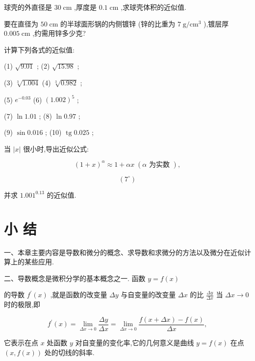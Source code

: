 \documentclass[lang=cn,newtx,12pt,scheme=chinese]{elegantbook}
\begin{document}
\begin{problemset}[习 题 八]
\item 球壳的外直径是 \({30}\mathrm{\;{cm}}\) ,厚度是 \({0.1}\mathrm{\;{cm}}\) ,求球壳体积的近似值.

\item 要在直径为 \({50}\mathrm{\;{cm}}\) 的半球面形锅的内侧镀锌 (锌的比重为 \(7\mathrm{\;g}/{\mathrm{{cm}}}^{3}\) ),镀层厚 \({0.005}\mathrm{\;{cm}}\) ,约需用锌多少克?

\item 计算下列各式的近似值:

(1) \(\sqrt{9.01}\) ; (2) \(\sqrt{15.98}\) ;

(3) \(\sqrt[3]{1.004}\) (4) \(\sqrt[3]{0.982}\) ;

(5) \({e}^{-{0.03}}\) (6) \({\left( {1.002}\right) }^{5}\) ;

(7) \(\ln {1.01}\) ; (8) \(\ln {0.97}\) ;

(9) \(\sin {0.016}\) ; (10) \(\operatorname{tg}{0.025}\) ;

\item 当 \(\left| x\right|\) 很小时,导出近似公式:

\[
{\left( 1 + x\right) }^{\alpha } \approx 1 + {\alpha x}\;\left( {\alpha \text{ 为实数 }}\right) ,
\]

\[
\left( {7}^{ \circ }\right)
\]

并求 \({1.001}^{0.13}\) 的近似值.

\end{problemset}

\chapter*{小 结}

一、本章主要内容是导数和微分的概念、求导数和求微分的方法以及微分在近似计算上的某些应用.

二、导数概念是微积分学的基本概念之一. 函数 \(y = f\left( x\right)\)

的导数 \({f}^{\prime }\left( x\right)\) ,就是函数的改变量 \({\Delta y}\) 与自变量的改变量 \({\Delta x}\) 的比 \(\frac{\Delta y}{\Delta x}\) 当 \({\Delta x} \rightarrow 0\) 时的极限,即

\[
{f}^{\prime }\left( x\right) = \mathop{\lim }\limits_{{{\Delta x} \rightarrow 0}}\frac{\Delta y}{\Delta x} = \mathop{\lim }\limits_{{{\Delta x} \rightarrow 0}}\frac{f\left( {x + {\Delta x}}\right) - f\left( x\right) }{\Delta x},
\]

它表示在点 \(x\) 处函数 \(y\) 对自变量的变化率,它的几何意义是曲线 \(y = f\left( x\right)\) 在点 \(\left( {x,f\left( x\right) }\right)\) 处的切线的斜率.
\end{document}
